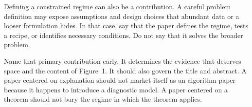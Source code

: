 Defining a constrained regime can also be a contribution. A careful problem
definition may expose assumptions and design choices that abundant data or a
looser formulation hides. In that case, say that the paper defines the regime,
tests a recipe, or identifies necessary conditions. Do not say that it solves
the broader problem.

Name that primary contribution early. It determines the evidence that deserves
space and the content of Figure~1. It should also govern the title and
abstract. A paper centered on explanation should not market itself as an
algorithm paper because it happens to introduce a diagnostic model. A paper
centered on a theorem should not bury the regime in which the theorem applies.
